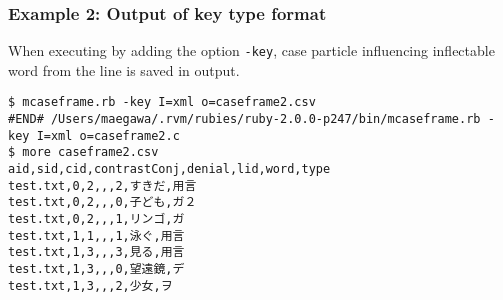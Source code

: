 \subsubsection*{Example 2: Output of key type format}

When executing by adding the option \verb|-key|, 
case particle influencing inflectable word from the line is saved in output. 


\begin{Verbatim}[baselinestretch=0.7,frame=single]
$ mcaseframe.rb -key I=xml o=caseframe2.csv
#END# /Users/maegawa/.rvm/rubies/ruby-2.0.0-p247/bin/mcaseframe.rb -key I=xml o=caseframe2.c
$ more caseframe2.csv
aid,sid,cid,contrastConj,denial,lid,word,type
test.txt,0,2,,,2,すきだ,用言
test.txt,0,2,,,0,子ども,ガ２
test.txt,0,2,,,1,リンゴ,ガ
test.txt,1,1,,,1,泳ぐ,用言
test.txt,1,3,,,3,見る,用言
test.txt,1,3,,,0,望遠鏡,デ
test.txt,1,3,,,2,少女,ヲ
\end{Verbatim}
